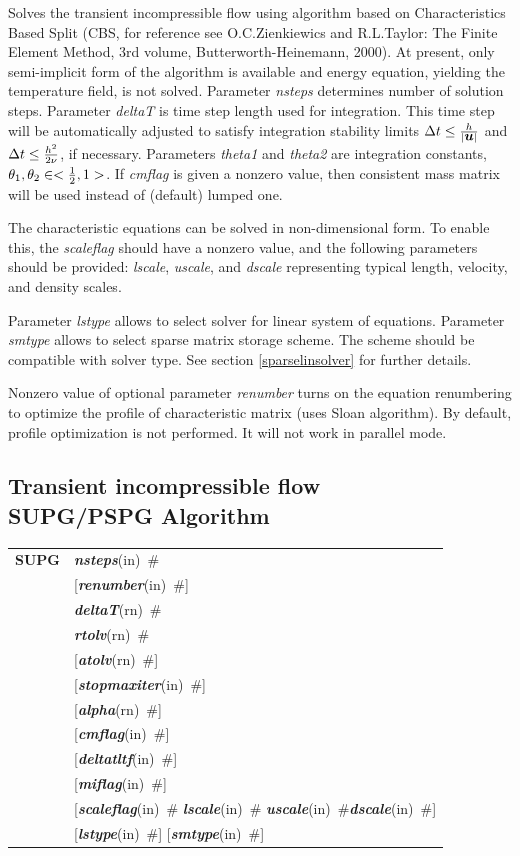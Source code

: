 \documentclass[a4paper]{article}
\makeatletter
\newcommand{\mbf}[1]{\mbox{\boldmath$#1$}}
\newcommand{\param}[1]{{\em #1}}
\newcommand{\keywordnotype}[1]{\mbox{{\it{\bf{#1}}}}}
\newcommand{\keyword}[2]{\mbox{{\keywordnotype{#1}\tiny (#2)}}}
\newcommand{\entKeywordInst}[1]{\mbox{{\bf{{#1}}}}}
\newcommand{\field}[2]{\mbox{\keyword{#1}{#2}~\#}}
\newcommand{\optField}[2]{\mbox{[\field{#1}{#2}]}}
\newenvironment{record}[1][]{\begin{tabular}{|ll}}{\end{tabular}\\}
\newcommand{\recentry}[2]{{#1}&{#2}\\}
\newcounter{rcc}
\newenvironment{record}[1][\textwidth]{\setcounter{rcc}{0}\begin{tabular*}{#1}{|ll@{\extracolsep{\fill}}r}}{\end{tabular*}\\}
\newcommand{\recentry}[2]{\ifthenelse{\value{rcc}>0}{&$\backslash$ \\}{\setcounter{rcc}{1}}{#1}&{#2}}
\makeatother
\begin{document}
Solves the transient incompressible flow using algorithm based on
Characteristics Based Split (CBS, for reference see O.C.Zienkiewics
and R.L.Taylor: The Finite Element Method, 3rd volume,
Butterworth-Heinemann, 2000). At present, only semi-implicit form
of the algorithm is available and energy equation, yielding the
temperature field, is not solved. 
Parameter \param{nsteps} determines number of solution
steps. Parameter \param{deltaT} is time step length used for
integration. This time step will be automatically adjusted to satisfy
integration stability limits $\Delta t \le {h\over{\vert
  \mbf{u}\vert}}$ and $\Delta t \le {{h^2}\over{2\nu}}$, if necessary. Parameters \param{theta1}
and \param{theta2} are integration constants, $\theta_1, \theta_2 \in <{1\over 2}, 1>$. If \param{cmflag} is given a nonzero value, then
consistent mass matrix will be used instead of (default) lumped one.

The characteristic equations can be solved in non-dimensional form. To
enable this, the \param{scaleflag} should have a nonzero value,
and the following parameters should be provided: \param{lscale},
\param{uscale}, and \param{dscale} representing typical length,
velocity, and density scales. 

Parameter \param{lstype} allows to select solver for linear system of
equations. Parameter \param{smtype} allows to select sparse matrix storage
scheme. The scheme should be compatible with solver type. See section
\ref{sparselinsolver} for further details.

Nonzero value of optional parameter \param{renumber} turns on the
equation renumbering to optimize the profile of characteristic matrix
(uses Sloan algorithm). By default, profile optimization is not
performed. It will not work in parallel mode.

\subsection{Transient incompressible flow\\SUPG/PSPG Algorithm}
\label{supgIncomp}
\begin{record}
\recentry{\entKeywordInst{SUPG}}{\field{nsteps}{in}}
\recentry{}{\optField{renumber}{in}}
\recentry{}{\field{deltaT}{rn}} \recentry{}{\field{rtolv}{rn}} \recentry{}{\optField{atolv}{rn}}
\recentry{}{\optField{stopmaxiter}{in}}
\recentry{}{\optField{alpha}{rn}} \recentry{}{\optField{cmflag}{in}} \recentry{}{\optField{deltatltf}{in}}
\recentry{}{\optField{miflag}{in}}
\recentry{}{[\field{scaleflag}{in} \field{lscale}{in} \field{uscale}{in}\field{dscale}{in}]}
\recentry{}{\optField{lstype}{in} \optField{smtype}{in}}
\end{record}
\end{document}
